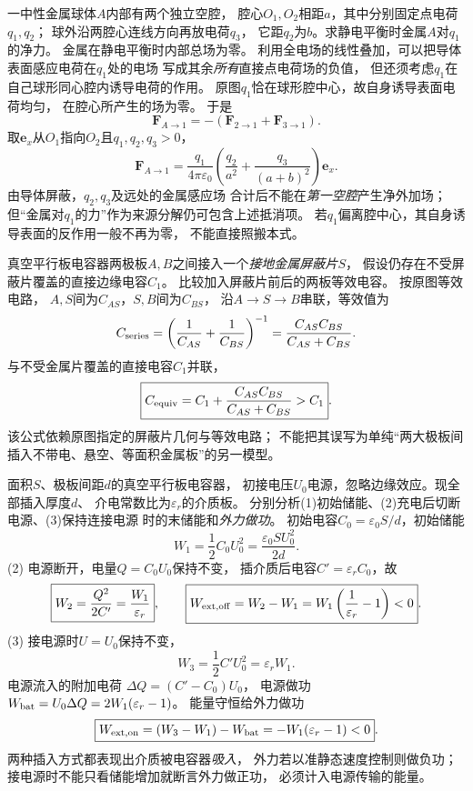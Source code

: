 \problemtext 一中性金属球体$A$内部有两个独立空腔，
腔心$O_1,O_2$相距$a$，其中分别固定点电荷$q_1,q_2$；
球外沿两腔心连线方向再放电荷$q_3$，
它距$q_2$为$b$。求静电平衡时金属$A$对$q_1$的净力。
\workings
金属在静电平衡时内部总场为零。
利用全电场的线性叠加，可以把导体表面感应电荷在$q_1$处的电场
写成其余\emph{所有}直接点电荷场的负值，
但还须考虑$q_1$在自己球形同心腔内诱导电荷的作用。
原图$q_1$恰在球形腔中心，故自身诱导表面电荷均匀，
在腔心所产生的场为零。
于是
\[
\boxed{\bm F_{A\to1}
=-(\bm F_{2\to1}+\bm F_{3\to1})}.
\]
取$\bm e_x$从$O_1$指向$O_2$且$q_1,q_2,q_3>0$，
\[
\boxed{\bm F_{A\to1}
=\frac{q_1}{4\pi\varepsilon_0}
\left(\frac{q_2}{a^2}+
\frac{q_3}{(a+b)^2}\right)\bm e_x}.
\]
\crosscheck 由导体屏蔽，$q_2,q_3$及远处的金属感应场
合计后不能在\emph{第一空腔}产生净外加场；
但“金属对$q_1$的力”作为来源分解仍可包含上述抵消项。
若$q_1$偏离腔中心，其自身诱导表面的反作用一般不再为零，
不能直接照搬本式。

\problemtext 真空平行板电容器两极板$A,B$之间接入一个\emph{接地金属屏蔽片}$S$，
假设仍存在不受屏蔽片覆盖的直接边缘电容$C_1$。
比较加入屏蔽片前后的两板等效电容。
\workings
按原图等效电路，
$A,S$间为$C_{AS}$，$S,B$间为$C_{BS}$，
沿$A\to S\to B$串联，等效值为
\[
C_{\rm series}=\left(\frac1{C_{AS}}+\frac1{C_{BS}}\right)^{-1}
=\frac{C_{AS}C_{BS}}{C_{AS}+C_{BS}}.
\]
与不受金属片覆盖的直接电容$C_1$并联，
\[
\boxed{C_{\rm equiv}=C_1+\frac{C_{AS}C_{BS}}{C_{AS}+C_{BS}}>C_1}.
\]
\crosscheck 该公式依赖原图指定的屏蔽片几何与等效电路；
不能把其误写为单纯“两大极板间插入不带电、悬空、等面积金属板”的另一模型。

\problemtext 面积$S$、极板间距$d$的真空平行板电容器，
初接电压$U_0$电源，忽略边缘效应。现全部插入厚度$d$、
介电常数比为$\varepsilon_r$的介质板。
分别分析(1)初始储能、(2)充电后切断电源、(3)保持连接电源
时的末储能和\emph{外力做功}。
\workings
初始电容$C_0=\varepsilon_0S/d$，初始储能
\[
\boxed{W_1=\frac12C_0U_0^2=\frac{\varepsilon_0SU_0^2}{2d}}.
\]
(2) 电源断开，电量$Q=C_0U_0$保持不变，
插介质后电容$C'=\varepsilon_rC_0$，故
\[
\boxed{W_2=\frac{Q^2}{2C'}=\frac{W_1}{\varepsilon_r}},
\qquad
\boxed{W_{\rm ext,off}=W_2-W_1
=W_1\left(\frac1{\varepsilon_r}-1\right)<0}.
\]
(3) 接电源时$U=U_0$保持不变，
\[
\boxed{W_3=\frac12C'U_0^2=\varepsilon_r W_1}.
\]
电源流入的附加电荷
$\Delta Q=(C'-C_0)U_0$，
电源做功$W_{\rm bat}=U_0\Delta Q
=2W_1(\varepsilon_r-1)$。
能量守恒给外力做功
\[
\boxed{W_{\rm ext,on}=(W_3-W_1)-W_{\rm bat}
=-W_1(\varepsilon_r-1)<0}.
\]
\crosscheck 两种插入方式都表现出介质被电容器\emph{吸入}，
外力若以准静态速度控制则做负功；
接电源时不能只看储能增加就断言外力做正功，
必须计入电源传输的能量。
